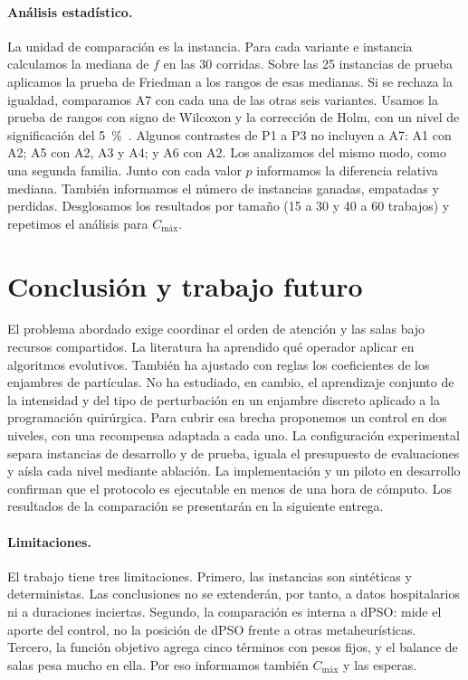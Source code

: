 \documentclass[10pt,a4paper]{article}
\newcommand{\Cmax}{C_{\text{máx}}}
\begin{document}
\paragraph{Análisis estadístico.}
La unidad de comparación es la instancia. Para cada variante e instancia calculamos la mediana
de $f$ en las 30 corridas. Sobre las 25 instancias de prueba aplicamos la prueba de Friedman a
los rangos de esas medianas. Si se rechaza la igualdad, comparamos A7 con cada una de las otras
seis variantes. Usamos la prueba de rangos con signo de Wilcoxon y la corrección de Holm, con
un nivel de significación del 5~\%~\cite{derrac2011}. Algunos contrastes de P1 a P3 no incluyen
a A7: A1 con A2; A5 con A2, A3 y A4; y A6 con A2. Los analizamos del mismo modo, como una
segunda familia. Junto con cada valor $p$ informamos la diferencia relativa mediana. También
informamos el número de instancias ganadas, empatadas y perdidas. Desglosamos los resultados
por tamaño (15 a 30 y 40 a 60 trabajos) y repetimos el análisis para $\Cmax$.

\section{Conclusión y trabajo futuro}

El problema abordado exige coordinar el orden de atención y las salas bajo recursos
compartidos. La literatura ha aprendido qué operador aplicar en algoritmos evolutivos. También
ha ajustado con reglas los coeficientes de los enjambres de partículas. No ha estudiado, en cambio,
el aprendizaje conjunto de la intensidad y del tipo de perturbación en un enjambre discreto
aplicado a la programación quirúrgica. Para cubrir esa brecha proponemos un control en dos
niveles, con una recompensa adaptada a cada uno. La configuración experimental separa
instancias de desarrollo y de prueba, iguala el presupuesto de evaluaciones y aísla cada nivel
mediante ablación. La implementación y un piloto en desarrollo confirman que el protocolo es
ejecutable en menos de una hora de cómputo. Los resultados de la comparación se presentarán en
la siguiente entrega.

\paragraph{Limitaciones.}
El trabajo tiene tres limitaciones. Primero, las instancias son sintéticas y deterministas.
Las conclusiones no se extenderán, por tanto, a datos hospitalarios ni a duraciones inciertas.
Segundo, la comparación es interna a dPSO: mide el aporte del control, no la posición de dPSO
frente a otras metaheurísticas. Tercero, la función objetivo agrega cinco términos con pesos
fijos, y el balance de salas pesa mucho en ella. Por eso informamos también $\Cmax$ y las
esperas.
\end{document}
